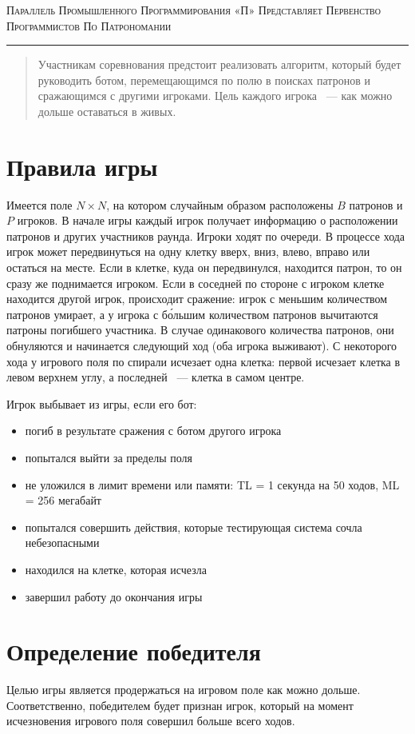 \documentclass[a4paper,12pt]{article}
\begin{document}
\begin{center}
{\small\textsc{Параллель Промышленного Программирования «П» Представляет Первенство Программистов По Патрономании}}
\vskip 1pt \hrule \vskip 3pt

\end{center}
\begin{abstract}
Участникам соревнования предстоит реализовать алгоритм, который будет руководить ботом, перемещающимся по полю в поисках патронов и сражающимся с другими игроками. Цель каждого игрока ~--- как можно дольше оставаться в живых.
\end{abstract}
\section{Правила игры}
Имеется поле $N\times N$, на котором случайным образом расположены $B$ патронов и $P$ игроков. В начале игры каждый игрок получает информацию о расположении патронов и других участников раунда. Игроки ходят по очереди. В процессе хода игрок может передвинуться на одну клетку вверх, вниз, влево, вправо или остаться на месте. Если в клетке, куда он передвинулся, находится патрон, то он сразу же поднимается игроком. Если в соседней по стороне с игроком клетке находится другой игрок, происходит сражение: игрок с меньшим количеством патронов умирает, а у игрока с б\'{о}льшим количеством патронов вычитаются патроны погибшего участника. В случае одинакового количества патронов, они обнуляются и начинается следующий ход (оба игрока выживают). С некоторого хода у игрового поля по спирали исчезает одна клетка: первой исчезает клетка в левом верхнем углу, а последней ~--- клетка в самом центре.
\begin{flushleft}
Игрок выбывает из игры, если его бот:
\begin{itemize}
\item погиб в результате сражения с ботом другого игрока
\item попытался выйти за пределы поля
\item не уложился в лимит времени или памяти:
TL = 1 секунда на 50 ходов, ML = 256 мегабайт
\item попытался совершить действия, которые тестирующая система сочла небезопасными
\item находился на клетке, которая исчезла
\item завершил работу до окончания игры
\end{itemize}
\end{flushleft}
\section{Определение победителя}
Целью игры является продержаться на игровом поле как можно дольше. Соответственно, победителем будет признан игрок, который на момент исчезновения игрового поля совершил больше всего ходов.
\end{document}
